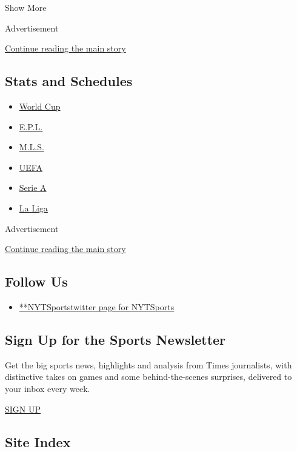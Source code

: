Show More

Advertisement

\protect\hyperlink{after-mid1}{Continue reading the main story}

\hypertarget{stats-and-schedules}{%
\subsection{Stats and Schedules}\label{stats-and-schedules}}

\begin{itemize}
\tightlist
\item
  \protect\hyperlink{}{World Cup}
\item
  \protect\hyperlink{}{E.P.L.}
\item
  \protect\hyperlink{}{M.L.S.}
\item
  \protect\hyperlink{}{UEFA}
\item
  \protect\hyperlink{}{Serie A}
\item
  \protect\hyperlink{}{La Liga}
\end{itemize}

Advertisement

\protect\hyperlink{after-mktg}{Continue reading the main story}

\hypertarget{follow-us}{%
\subsection{Follow Us}\label{follow-us}}

\begin{itemize}
\tightlist
\item
  \href{https://twitter.com/NYTSports}{**NYTSportstwitter page for
  NYTSports}
\end{itemize}

\hypertarget{sign-up-for-the-sports-newsletter}{%
\subsection{Sign Up for the Sports
Newsletter}\label{sign-up-for-the-sports-newsletter}}

Get the big sports news, highlights and analysis from Times journalists,
with distinctive takes on games and some behind-the-scenes surprises,
delivered to your inbox every week.

\href{/newsletters/signup/SP}{SIGN UP}

\hypertarget{site-index}{%
\subsection{Site Index}\label{site-index}}

